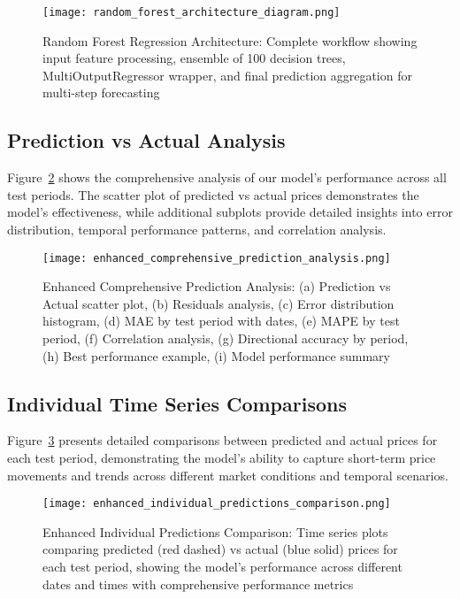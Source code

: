 \documentclass[11pt,a4paper]{article}
\begin{document}
\begin{figure}[H]
\centering
\texttt{[image: random\_forest\_architecture\_diagram.png]}
\caption{Random Forest Regression Architecture: Complete workflow showing input feature processing, ensemble of 100 decision trees, MultiOutputRegressor wrapper, and final prediction aggregation for multi-step forecasting}
\label{fig:architecture}
\end{figure}

\subsection{Prediction vs Actual Analysis}

Figure~\ref{fig:comprehensive} shows the comprehensive analysis of our model's performance across all test periods. The scatter plot of predicted vs actual prices demonstrates the model's effectiveness, while additional subplots provide detailed insights into error distribution, temporal performance patterns, and correlation analysis.

\begin{figure}[H]
\centering
\texttt{[image: enhanced\_comprehensive\_prediction\_analysis.png]}
\caption{Enhanced Comprehensive Prediction Analysis: (a) Prediction vs Actual scatter plot, (b) Residuals analysis, (c) Error distribution histogram, (d) MAE by test period with dates, (e) MAPE by test period, (f) Correlation analysis, (g) Directional accuracy by period, (h) Best performance example, (i) Model performance summary}
\label{fig:comprehensive}
\end{figure}

\subsection{Individual Time Series Comparisons}

Figure~\ref{fig:individual} presents detailed comparisons between predicted and actual prices for each test period, demonstrating the model's ability to capture short-term price movements and trends across different market conditions and temporal scenarios.

\begin{figure}[H]
\centering
\texttt{[image: enhanced\_individual\_predictions\_comparison.png]}
\caption{Enhanced Individual Predictions Comparison: Time series plots comparing predicted (red dashed) vs actual (blue solid) prices for each test period, showing the model's performance across different dates and times with comprehensive performance metrics}
\label{fig:individual}
\end{figure}
\end{document}
